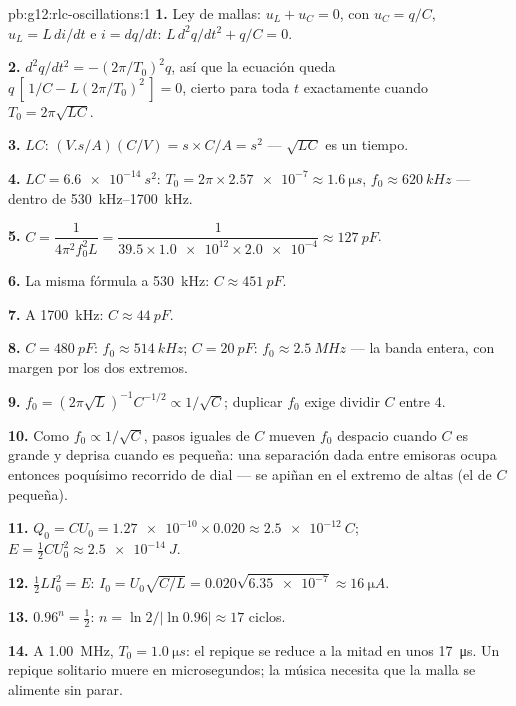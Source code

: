 \begin{solution}{pb:g12:rlc-oscillations:1}
\textbf{1.} Ley de mallas: $u_L + u_C = 0$, con $u_C = q/C$,
$u_L = L\,di/dt$ e $i = dq/dt$: $L\,d^2q/dt^2 + q/C = 0$.

\textbf{2.} $d^2q/dt^2 = -(2\pi/T_0)^2 q$, así que la ecuación queda
$q\,[\,1/C - L(2\pi/T_0)^2\,] = 0$, cierto para toda $t$ exactamente
cuando $T_0 = 2\pi\sqrt{LC}$.

\textbf{3.} $LC$: $(\unit{V.s/A})(\unit{C/V}) = \unit{s} \times
\unit{C/A} = \unit{s^2}$ --- $\sqrt{LC}$ es un tiempo.

\textbf{4.} $LC = \qty{6.6e-14}{s^2}$: $T_0 = 2\pi \times \num{2.57e-7}
\approx \qty{1.6}{\micro s}$, $f_0 \approx \qty{620}{kHz}$ --- dentro de
\qtyrange{530}{1700}{kHz}.

\textbf{5.} $C = \dfrac{1}{4\pi^2 f_0^2 L} = \dfrac{1}{39.5 \times
\num{1.0e12} \times \num{2.0e-4}} \approx \qty{127}{pF}$.

\textbf{6.} La misma fórmula a \qty{530}{kHz}: $C \approx \qty{451}{pF}$.

\textbf{7.} A \qty{1700}{kHz}: $C \approx \qty{44}{pF}$.

\textbf{8.} $C = \qty{480}{pF}$: $f_0 \approx \qty{514}{kHz}$;
$C = \qty{20}{pF}$: $f_0 \approx \qty{2.5}{MHz}$ --- la banda entera,
con margen por los dos extremos.

\textbf{9.} $f_0 = (2\pi\sqrt{L})^{-1}C^{-1/2} \propto 1/\sqrt{C}$;
duplicar $f_0$ exige dividir $C$ entre $4$.

\textbf{10.} Como $f_0 \propto 1/\sqrt{C}$, pasos iguales de $C$ mueven
$f_0$ despacio cuando $C$ es grande y deprisa cuando es pequeña: una
separación dada entre emisoras ocupa entonces poquísimo recorrido de
dial --- se apiñan en el extremo de  altas (el de $C$
pequeña).

\textbf{11.} $Q_0 = CU_0 = \num{1.27e-10} \times 0.020 \approx
\qty{2.5e-12}{C}$; $E = \tfrac12 CU_0^2 \approx \qty{2.5e-14}{J}$.

\textbf{12.} $\tfrac12 LI_0^2 = E$: $I_0 = U_0\sqrt{C/L} =
0.020\sqrt{\num{6.35e-7}} \approx \qty{16}{\micro A}$.

\textbf{13.} $0.96^n = \tfrac12$: $n = \ln 2/\lvert\ln 0.96\rvert
\approx 17$ ciclos.

\textbf{14.} A \qty{1.00}{MHz}, $T_0 = \qty{1.0}{\micro s}$: el repique
se reduce a la mitad en unos \qty{17}{\micro s}. Un repique solitario
muere en microsegundos; la música necesita que la malla se alimente sin
parar.


\end{solution}
